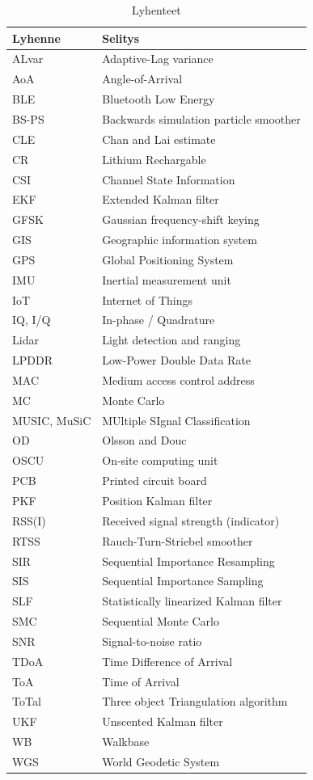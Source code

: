 \documentclass[
  12pt,
  a4paper, twoside]{book}
\begin{document}
\begin{table}

\caption{\label{tab:lyhenteet-ja-symbolit}Lyhenteet}
\centering
\begin{tabular}[t]{ll}
\toprule
Lyhenne & Selitys\\
\midrule
ALvar & Adaptive-Lag variance\\
AoA & Angle-of-Arrival\\
BLE & Bluetooth Low Energy\\
BS-PS & Backwards simulation particle smoother\\
CLE & Chan and Lai estimate\\
\addlinespace
CR & Lithium Rechargable\\
CSI & Channel State Information\\
EKF & Extended Kalman filter\\
GFSK & Gaussian frequency-shift keying\\
GIS & Geographic information system\\
\addlinespace
GPS & Global Positioning System\\
IMU & Inertial measurement unit\\
IoT & Internet of Things\\
IQ, I/Q & In-phase / Quadrature\\
Lidar & Light detection and ranging\\
\addlinespace
LPDDR & Low-Power Double Data Rate\\
MAC & Medium access control address\\
MC & Monte Carlo\\
MUSIC, MuSiC & MUltiple SIgnal Classification\\
OD & Olsson and Douc\\
\addlinespace
OSCU & On-site computing unit\\
PCB & Printed circuit board\\
PKF & Position Kalman filter\\
RSS(I) & Received signal strength (indicator)\\
RTSS & Rauch-Turn-Striebel smoother\\
\addlinespace
SIR & Sequential Importance Resampling\\
SIS & Sequential Importance Sampling\\
SLF & Statistically linearized Kalman filter\\
SMC & Sequential Monte Carlo\\
SNR & Signal-to-noise ratio\\
\addlinespace
TDoA & Time Difference of Arrival\\
ToA & Time of Arrival\\
ToTal & Three object Triangulation algorithm\\
UKF & Unscented Kalman filter\\
WB & Walkbase\\
\addlinespace
WGS & World Geodetic System\\
\bottomrule
\end{tabular}
\end{table}
\end{document}

